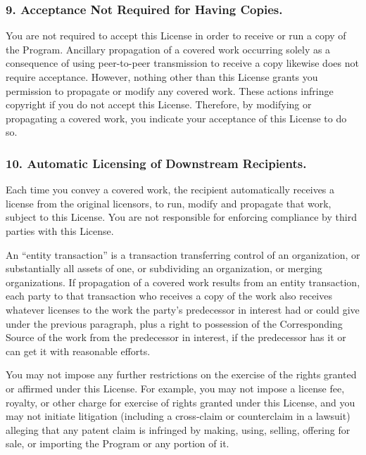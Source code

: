 \subsubsection{9. Acceptance Not Required for Having Copies.}
You are not required to accept this License in order to receive or run a copy of the Program. Ancillary propagation of a covered work occurring solely as a consequence of using peer-to-peer transmission to receive a copy likewise does not require acceptance. However, nothing other than this License grants you permission to propagate or modify any covered work. These actions infringe copyright if you do not accept this License. Therefore, by modifying or propagating a covered work, you indicate your acceptance of this License to do so.
\subsubsection{10. Automatic Licensing of Downstream Recipients.}
Each time you convey a covered work, the recipient automatically receives a license from the original licensors, to run, modify and propagate that work, subject to this License. You are not responsible for enforcing compliance by third parties with this License.\par
An “entity transaction” is a transaction transferring control of an organization, or substantially all assets of one, or subdividing an organization, or merging organizations. If propagation of a covered work results from an entity transaction, each party to that transaction who receives a copy of the work also receives whatever licenses to the work the party's predecessor in interest had or could give under the previous paragraph, plus a right to possession of the Corresponding Source of the work from the predecessor in interest, if the predecessor has it or can get it with reasonable efforts.\par
You may not impose any further restrictions on the exercise of the rights granted or affirmed under this License. For example, you may not impose a license fee, royalty, or other charge for exercise of rights granted under this License, and you may not initiate litigation (including a cross-claim or counterclaim in a lawsuit) alleging that any patent claim is infringed by making, using, selling, offering for sale, or importing the Program or any portion of it.

